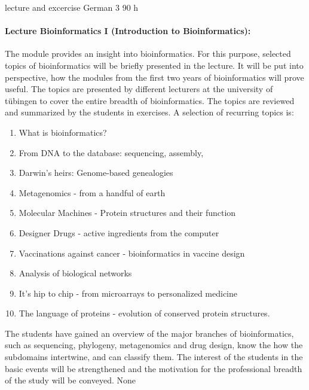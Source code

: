 {lecture and excercise}
{German}
{3}
{90 h}
{\paragraph{Lecture Bioinformatics I (Introduction to Bioinformatics): } 
The module provides an insight into bioinformatics. For this purpose, selected topics of bioinformatics will be briefly presented in the lecture. It will be put into perspective, how the modules from the first two years of bioinformatics will prove useful. The topics are presented by different lecturers at the university of tübingen to cover the entire breadth of bioinformatics. The topics are reviewed and summarized by the students in exercises. A selection of recurring topics is: 
\begin{enumerate}
\item What is bioinformatics? 
\item From DNA to the database: sequencing, assembly, 
\item Darwin's heirs: Genome-based genealogies
\item Metagenomics - from a handful of earth
\item Molecular Machines - Protein structures and their function 
\item Designer Drugs - active ingredients from the computer
\item Vaccinations against cancer - bioinformatics in vaccine design 
\item Analysis of biological networks
\item It's hip to chip - from microarrays to personalized medicine
\item The language of proteins - evolution of conserved protein structures.
\end{enumerate}} 
{The students have gained an overview of the major branches of bioinformatics, such as sequencing, phylogeny, metagenomics and drug design, know the how the subdomains intertwine, and can classify them. The interest of the students in the basic events will be strengthened and the motivation for the professional breadth of the study will be conveyed.}
{None}